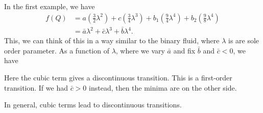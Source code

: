\documentclass[a4paper]{article}
\begin{document}
In the first example, we have
\begin{align*}
  f(Q) &= a \left(\frac{3}{2} \lambda^2\right) + c \left(\frac{3}{4} \lambda^3\right) + b_1\left(\frac{9}{4} \lambda^4\right) + b_2 \left(\frac{9}{8} \lambda^4\right)\\
  &= \bar{a} \lambda^2 + \bar{c} \lambda^3 + \bar{b}\lambda^4.
\end{align*}
This, we can think of this in a way similar to the binary fluid, where $\lambda$ is are sole order parameter. As a function of $\lambda$, where we vary $\bar{a}$ and fix $\bar{b}$ and $\bar{c} < 0$, we have
\begin{center}
\end{center}
Here the cubic term gives a discontinuous transition. This is a first-order transition. If we had $\bar{c} > 0$ instead, then the minima are on the other side.

In general, cubic terms lead to discontinuous transitions.
\end{document}
